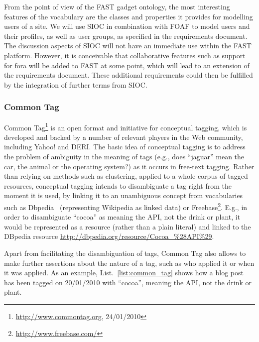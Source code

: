 \documentclass{article}
\begin{document}
From the point of view of the FAST gadget ontology, the most interesting features of the vocabulary are the classes and properties it provides for modelling users of a site. We will use SIOC in combination with FOAF to model users and their profiles, as well as user groups, as specified in the requirements document. The discussion aspects of SIOC will not have an immediate use within the FAST platform. However, it is conceivable that collaborative features such as support for fora will be added to FAST at some point, which will lead to an extension of the requirements document. These additional requirements could then be fulfilled by the integration of further terms from SIOC.

\subsubsection{Common Tag} %
\label{ssub:common_tag}

Common Tag\footnote{\url{http://www.commontag.org}, 24/01/2010} is an open format and initiative for conceptual tagging, which is developed and backed by a number of relevant players in the Web community, including Yahoo! and DERI. The basic idea of conceptual tagging is to address the problem of ambiguity in the meaning of tags (e.g., does ``jaguar'' mean the car, the animal or the operating system?) as it occurs in free-text tagging. Rather than relying on methods such as clustering, applied to a whole corpus of tagged resources, conceptual tagging intends to disambiguate a tag right from the moment it is used, by linking it to an unambiguous concept from vocabularies such as Dbpedia~\cite{Auer07dbpedia} (representing Wikipedia as linked data) or Freebase\footnote{\url{http://www.freebase.com/}}. E.g., in order to disambiguate ``cocoa'' as meaning the API, not the drink or plant, it would be represented as a resource (rather than a plain literal) and linked to the DBpedia resource \url{http://dbpedia.org/resource/Cocoa_%28API%29}.

Apart from facilitating the disambiguation of tags, Common Tag also allows to make further assertions about the nature of a tag, such as who applied it or when it was applied. As an example, List.~\ref{list:common_tag} shows how a blog post has been tagged on 20/01/2010 with ``cocoa'', meaning the API, not the drink or plant.

\singlespacing
{}
\begin{figure}
	
\end{figure}
\doublespacing
\end{document}

